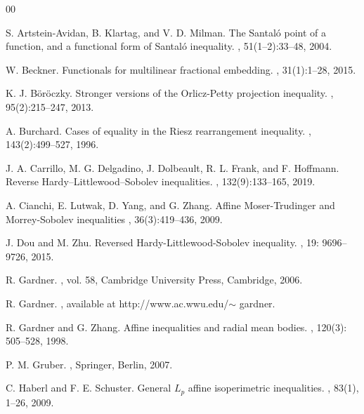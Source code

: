 \documentclass[preprint,12pt]{elsarticle}
\begin{document}
\begin{thebibliography}{00}

S. Artstein-Avidan, B. Klartag, and V. D. Milman.
\newblock The Santal\'o point of a function, and a functional form of Santal\'o inequality.
,
51(1–2):33--48, 2004.

W. Beckner.
\newblock Functionals for multilinear fractional embedding.
,
 31(1):1--28, 2015.
		
K. J. B\"{o}r\"{o}czky.
\newblock Stronger versions of the Orlicz-Petty projection inequality.
,
 95(2):215--247, 2013.

A. Burchard.
\newblock Cases of equality in the Riesz rearrangement inequality.
,
143(2):499--527, 1996.

J. A. Carrillo, M. G. Delgadino, J. Dolbeault, R. L. Frank, and F. Hoffmann.
\newblock Reverse Hardy–Littlewood–Sobolev inequalities.
, 
132(9):133--165, 2019.
        
A. Cianchi, E. Lutwak, D. Yang, and G. Zhang.
\newblock Affine Moser-Trudinger and Morrey-Sobolev inequalities
,
36(3):419--436, 2009.
		
J. Dou and M. Zhu.
\newblock Reversed Hardy-Littlewood-Sobolev inequality.
,
19: 9696--9726, 2015.
		
R. Gardner.
,
\newblock vol. 58, Cambridge University Press, Cambridge, 2006.
		
R. Gardner.
, 
\newblock available at http://www.ac.wwu.edu/$\sim$ gardner.
		
R. Gardner and G. Zhang.
\newblock Affine inequalities and radial mean bodies.
,
120(3): 505--528, 1998.
		
P. M. Gruber.
,
\newblock Springer, Berlin, 2007.	
		
C. Haberl and F. E. Schuster.
\newblock General ${L}_{p}$ affine isoperimetric inequalities.
,
 83(1), 1--26, 2009.
		

\end{thebibliography}
\end{document}
